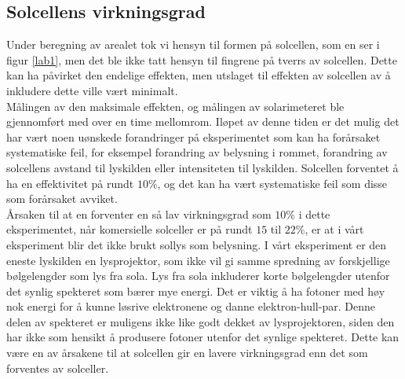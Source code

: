 \documentclass[%
 reprint,
 amsmath,amssymb,
 aps,
 norsk,
 booktabs
]{revtex4-1}
\begin{document}
\subsection{Solcellens virkningsgrad}
Under beregning av arealet tok vi hensyn til formen på solcellen, som en ser i figur \vref{lab1}, men det ble ikke tatt hensyn til fingrene på tverrs av solcellen. Dette kan ha påvirket den endelige effekten, men utslaget til effekten av solcellen av å inkludere dette ville vært minimalt.\\
Målingen av den maksimale effekten, og målingen av solarimeteret ble gjennomført med over en time mellomrom. Iløpet av denne tiden er det mulig det har vært noen uønskede forandringer på eksperimentet som kan ha forårsaket systematiske feil, for eksempel forandring av belysning i rommet, forandring av solcellens avstand til lyskilden eller intensiteten til lyskilden. Solcellen forventet å ha en effektivitet på rundt $10\%$, og det kan ha vært systematiske feil som disse som forårsaket avviket.\\
Årsaken til at en forventer en så lav virkningsgrad som $10\%$ i dette eksperimentet, når komersielle solceller er på rundt $15$ til $22\%$, er at i vårt eksperiment blir det ikke brukt sollys som belysning. I vårt eksperiment er den eneste lyskilden en lysprojektor, som ikke vil gi samme spredning av forskjellige bølgelengder som lys fra sola. Lys fra sola inkluderer korte bølgelengder utenfor det synlig spekteret som bærer mye energi. Det er viktig å ha fotoner med høy nok energi for å kunne løsrive elektronene og danne elektron-hull-par. Denne delen av spekteret er muligens ikke like godt dekket av lysprojektoren, siden den har ikke som hensikt å produsere fotoner utenfor det synlige spekteret. Dette kan være en av årsakene til at solcellen gir en lavere virkningsgrad enn det som forventes av solceller.
\end{document}
